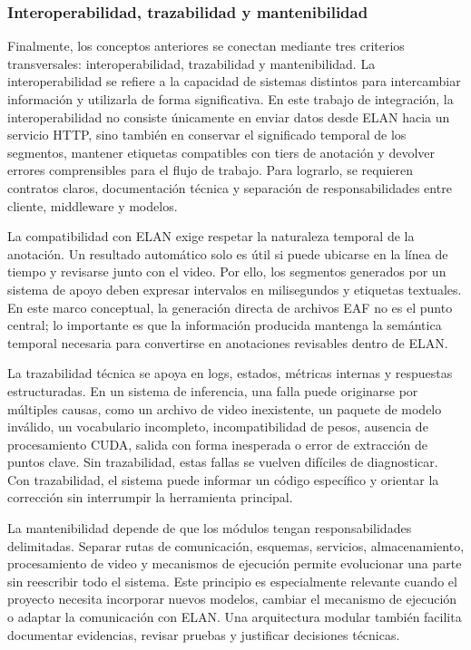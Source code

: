 \subsubsection{Interoperabilidad, trazabilidad y mantenibilidad}

Finalmente, los conceptos anteriores se conectan mediante tres criterios transversales: interoperabilidad, trazabilidad y mantenibilidad. La interoperabilidad se refiere a la capacidad de sistemas distintos para intercambiar información y utilizarla de forma significativa. En este trabajo de integración, la interoperabilidad no consiste únicamente en enviar datos desde ELAN hacia un servicio HTTP, sino también en conservar el significado temporal de los segmentos, mantener etiquetas compatibles con tiers de anotación y devolver errores comprensibles para el flujo de trabajo. Para lograrlo, se requieren contratos claros, documentación técnica y separación de responsabilidades entre cliente, middleware y modelos.

La compatibilidad con ELAN exige respetar la naturaleza temporal de la anotación. Un resultado automático solo es útil si puede ubicarse en la línea de tiempo y revisarse junto con el video. Por ello, los segmentos generados por un sistema de apoyo deben expresar intervalos en milisegundos y etiquetas textuales. En este marco conceptual, la generación directa de archivos EAF no es el punto central; lo importante es que la información producida mantenga la semántica temporal necesaria para convertirse en anotaciones revisables dentro de ELAN.

La trazabilidad técnica se apoya en logs, estados, métricas internas y respuestas estructuradas. En un sistema de inferencia, una falla puede originarse por múltiples causas, como un archivo de video inexistente, un paquete de modelo inválido, un vocabulario incompleto, incompatibilidad de pesos, ausencia de procesamiento CUDA, salida con forma inesperada o error de extracción de puntos clave. Sin trazabilidad, estas fallas se vuelven difíciles de diagnosticar. Con trazabilidad, el sistema puede informar un código específico y orientar la corrección sin interrumpir la herramienta principal.

La mantenibilidad depende de que los módulos tengan responsabilidades delimitadas. Separar rutas de comunicación, esquemas, servicios, almacenamiento, procesamiento de video y mecanismos de ejecución permite evolucionar una parte sin reescribir todo el sistema. Este principio es especialmente relevante cuando el proyecto necesita incorporar nuevos modelos, cambiar el mecanismo de ejecución o adaptar la comunicación con ELAN. Una arquitectura modular también facilita documentar evidencias, revisar pruebas y justificar decisiones técnicas.

